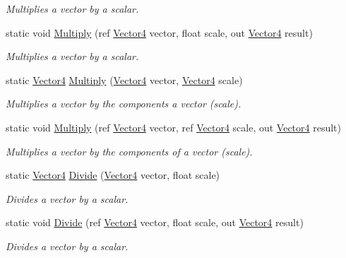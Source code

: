 \begin{DoxyCompactItemize}
\begin{DoxyCompactList}\small\item\em Multiplies a vector by a scalar. \end{DoxyCompactList}\item 
static void \hyperlink{struct_open_t_k_1_1_vector4_a325e236d8b78980db2a24142891acbbf}{Multiply} (ref \hyperlink{struct_open_t_k_1_1_vector4}{Vector4} vector, float scale, out \hyperlink{struct_open_t_k_1_1_vector4}{Vector4} result)
\begin{DoxyCompactList}\small\item\em Multiplies a vector by a scalar. \end{DoxyCompactList}\item 
static \hyperlink{struct_open_t_k_1_1_vector4}{Vector4} \hyperlink{struct_open_t_k_1_1_vector4_ab416ce8379f0c20805ffcf54397227ff}{Multiply} (\hyperlink{struct_open_t_k_1_1_vector4}{Vector4} vector, \hyperlink{struct_open_t_k_1_1_vector4}{Vector4} scale)
\begin{DoxyCompactList}\small\item\em Multiplies a vector by the components a vector (scale). \end{DoxyCompactList}\item 
static void \hyperlink{struct_open_t_k_1_1_vector4_acf6d7ad3cbb1f686c0d8c6f3bafa65fa}{Multiply} (ref \hyperlink{struct_open_t_k_1_1_vector4}{Vector4} vector, ref \hyperlink{struct_open_t_k_1_1_vector4}{Vector4} scale, out \hyperlink{struct_open_t_k_1_1_vector4}{Vector4} result)
\begin{DoxyCompactList}\small\item\em Multiplies a vector by the components of a vector (scale). \end{DoxyCompactList}\item 
static \hyperlink{struct_open_t_k_1_1_vector4}{Vector4} \hyperlink{struct_open_t_k_1_1_vector4_a6f3da4e97dafe25be3d43b432cb4be53}{Divide} (\hyperlink{struct_open_t_k_1_1_vector4}{Vector4} vector, float scale)
\begin{DoxyCompactList}\small\item\em Divides a vector by a scalar. \end{DoxyCompactList}\item 
static void \hyperlink{struct_open_t_k_1_1_vector4_a02667112b4fdb51e25612389dc963fa0}{Divide} (ref \hyperlink{struct_open_t_k_1_1_vector4}{Vector4} vector, float scale, out \hyperlink{struct_open_t_k_1_1_vector4}{Vector4} result)
\begin{DoxyCompactList}\small\item\em Divides a vector by a scalar. \end{DoxyCompactList}\item 

\end{DoxyCompactItemize}
